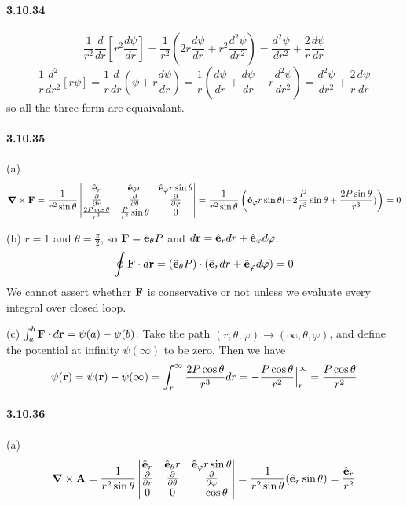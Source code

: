\documentclass[a4paper]{article}
\begin{document}
\paragraph{3.10.34}
\[
\frac{1}{r^2}\frac{d}{dr}\left[r^2\frac{d\psi}{dr} \right]=\frac{1}{r^2}(2r\frac{d\psi}{dr}+r^2\frac{d^2\psi}{dr^2})=\frac{d^2\psi}{dr^2}+\frac{2}{r}\frac{d\psi}{dr}
\]
\[
\frac{1}{r}\frac{d^2}{dr^2}\left[r\psi\right]=\frac{1}{r}\frac{d}{dr}(\psi+r\frac{d\psi}{dr})=\frac{1}{r}(\frac{d\psi}{dr}+\frac{d\psi}{dr}+r\frac{d^2\psi}{dr^2})=\frac{d^2\psi}{dr^2}+\frac{2}{r}\frac{d\psi}{dr}
\]
so all the three form are equaivalant.

\paragraph{3.10.35}
(a)
\[
\boldsymbol{\nabla}\times\mathbf{F}=\frac{1}{r^2\sin\theta}
\begin{vmatrix}
\hat{\mathbf{e}}_r&\hat{\mathbf{e}}_\theta r&\hat{\mathbf{e}}_\varphi r\sin\theta\\
\frac{\partial}{\partial r}&\frac{\partial}{\partial\theta}&\frac{\partial}{\partial\varphi}\\
\frac{2P\cos\theta}{r^3}&\frac{P}{r^2}\sin\theta&0\\
\end{vmatrix}
=\frac{1}{r^2\sin\theta}\left(\hat{\mathbf{e}}_\varphi r\sin\theta(-2\frac{P}{r^3}\sin\theta+\frac{2P\sin\theta}{r^3}) \right)=0
\]

(b) $r=1$ and $\theta=\frac{\pi}{2}$, so $\mathbf{F}=\hat{\mathbf{e}}_\theta P$ and $d\mathbf{r}=\hat{\mathbf{e}}_r dr+\hat{\mathbf{e}}_\varphi d\varphi$. 
\[
\oint\mathbf{F}\cdot d\mathbf{r}=(\hat{\mathbf{e}}_\theta P)\cdot(\hat{\mathbf{e}}_r dr+\hat{\mathbf{e}}_\varphi d\varphi)=0
\]
We cannot assert whether $\mathbf{F}$ is conservative or not unless we evaluate every integral over closed loop.

(c) $\int_a^b\mathbf{F}\cdot d\mathbf{r}=\psi(a)-\psi(b)$. Take the path $(r,\theta,\varphi)\rightarrow(\infty,\theta,\varphi)$, and define the potential at infinity $\psi(\infty)$ to be zero. Then we have
\[
\psi(\mathbf{r})=\psi(\mathbf{r})-\psi(\infty)=\int_r^\infty\frac{2P\cos\theta}{r^3}dr=-\frac{P\cos\theta}{r^2}\Big|_r^\infty=\frac{P\cos\theta}{r^2}
\]

\paragraph{3.10.36}
(a)
\[
\boldsymbol{\nabla}\times\mathbf{A}=\frac{1}{r^2\sin\theta}
\begin{vmatrix}
\hat{\mathbf{e}}_r&\hat{\mathbf{e}}_\theta r&\hat{\mathbf{e}}_\varphi r\sin\theta\\
\frac{\partial}{\partial r}&\frac{\partial}{\partial\theta}&\frac{\partial}{\partial\varphi}\\
0&0&-\cos\theta
\end{vmatrix}
=\frac{1}{r^2\sin\theta}(\hat{\mathbf{e}}_r\sin\theta)=\frac{\hat{\mathbf{e}}_r}{r^2}
\]
\end{document}
